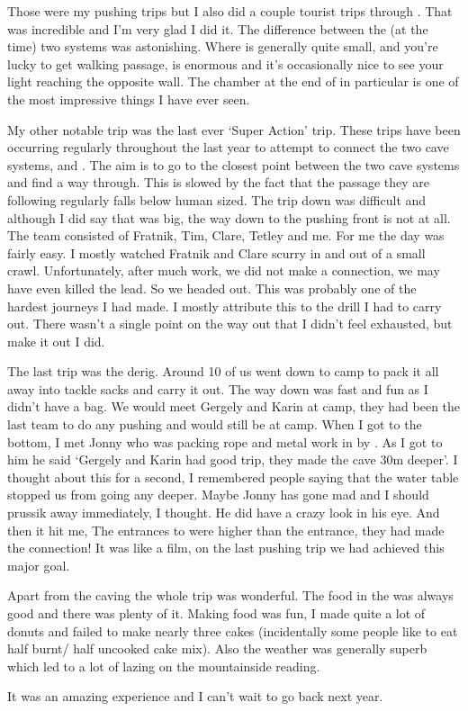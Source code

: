 Those were my pushing trips but I also did a couple tourist trips through . That was incredible and I’m very glad I did it. The difference between the (at the time) two systems was astonishing. Where  is generally quite small, and you’re lucky to get walking passage,  is enormous and it's occasionally nice to see your light reaching the opposite wall. The chamber at the end of  in particular is one of the most impressive things I have ever seen.

My other notable trip was the last ever ‘Super Action’ trip. These trips have been occurring regularly throughout the last year to attempt to connect the two cave systems,  and . The aim is to go to the closest point between the two cave systems and find a way through. This is slowed by the fact that the passage they are following regularly falls below human sized. The trip down was difficult and although I did say that  was big, the way down to the pushing front is not at all. The team consisted of Fratnik, Tim, Clare, Tetley and me. For me the day was fairly easy. I mostly watched Fratnik and Clare scurry in and out of a small crawl. Unfortunately, after much work, we did not make a connection, we may have even killed the lead. So we headed out. This was probably one of the hardest journeys I had made. I mostly attribute this to the drill I had to carry out. There wasn’t a single point on the way out that I didn’t feel exhausted, but make it out I did.

The last trip was the derig. Around 10 of us went down to camp to pack it all away into tackle sacks and carry it out. The way down was fast and fun as I didn’t have a bag. We would meet Gergely and Karin at camp, they had been the last team to do any pushing and would still be at camp. When I got to the bottom, I met Jonny who was packing rope and metal work in by . As I got to him he said ‘Gergely and Karin had good trip, they made the cave 30m deeper’. I thought about this for a second, I remembered people saying that the water table stopped us from going any deeper. Maybe Jonny has gone mad and I should prussik away immediately, I thought. He did have a crazy look in his eye. And then it hit me, The entrances to  were higher than the  entrance, they had made the connection! It was like a film, on the last pushing trip we had achieved this major goal.

Apart from the caving the whole trip was wonderful. The food in the  was always good and there was plenty of it. Making food was fun, I made quite a lot of donuts and failed to make nearly three cakes (incidentally some people like to eat half burnt/ half uncooked cake mix). Also the weather was generally superb which led to a lot of lazing on the mountainside reading.

It was an amazing experience and I can’t wait to go back next year.
